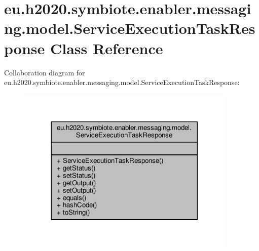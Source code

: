 \hypertarget{classeu_1_1h2020_1_1symbiote_1_1enabler_1_1messaging_1_1model_1_1ServiceExecutionTaskResponse}{}\section{eu.\+h2020.\+symbiote.\+enabler.\+messaging.\+model.\+Service\+Execution\+Task\+Response Class Reference}
\label{classeu_1_1h2020_1_1symbiote_1_1enabler_1_1messaging_1_1model_1_1ServiceExecutionTaskResponse}


Collaboration diagram for eu.\+h2020.\+symbiote.\+enabler.\+messaging.\+model.\+Service\+Execution\+Task\+Response\+:\nopagebreak
\begin{figure}[H]
\begin{center}
\leavevmode
\includegraphics[width=296pt]{classeu_1_1h2020_1_1symbiote_1_1enabler_1_1messaging_1_1model_1_1ServiceExecutionTaskResponse__coll__graph}
\end{center}
\end{figure}
